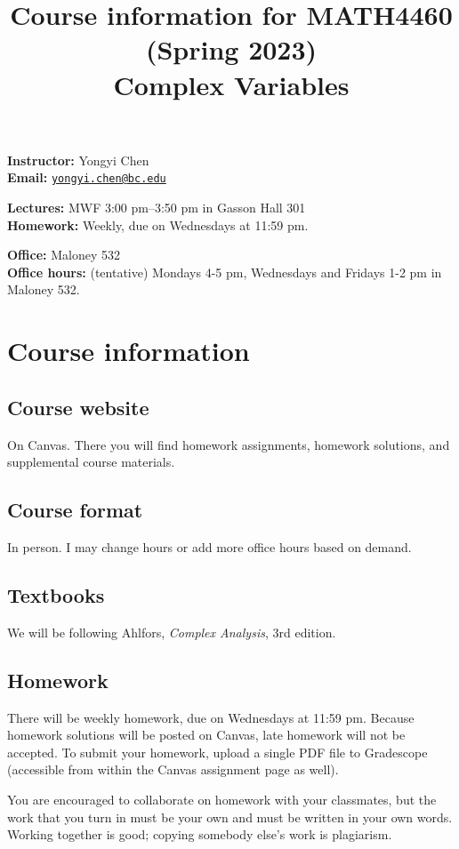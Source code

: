 \documentclass[11pt,oneside]{amsart}
\title{Course information for MATH4460 (Spring 2023)\\
    Complex Variables}
\begin{document}
\maketitle

\textbf{Instructor:} Yongyi Chen\\
\textbf{Email:} \href{mailto:yongyi.chen@bc.edu}{\texttt{yongyi.chen@bc.edu}}

\textbf{Lectures:} MWF 3:00 pm--3:50 pm in Gasson Hall 301\\
\textbf{Homework:} Weekly, due on Wednesdays at 11:59 pm.

\textbf{Office:} Maloney 532\\
\textbf{Office hours:} (tentative) Mondays 4-5 pm, Wednesdays and Fridays 1-2 pm in Maloney 532.

\section{Course information}
\subsection*{Course website}
On Canvas. There you will find homework assignments, homework solutions, and supplemental course materials.

\subsection*{Course format}
In person. I may change hours or add more office hours based on demand.

\subsection*{Textbooks}
We will be following Ahlfors, \emph{Complex Analysis}, 3rd edition.

\subsection*{Homework}
There will be weekly homework, due on Wednesdays at 11:59 pm. Because homework solutions will be posted on Canvas, late homework will not be accepted. To submit your homework, upload a single PDF file to Gradescope (accessible from within the Canvas assignment page as well).

You are encouraged to collaborate on homework with your classmates, but the work that you turn in must be your own and must be written in your own words.  Working together is good; copying somebody else’s work is plagiarism.
\end{document}
